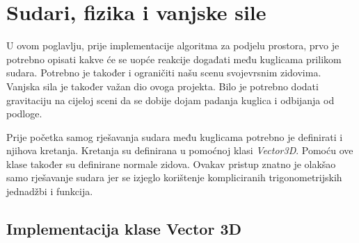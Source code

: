 \chapter{Sudari, fizika i vanjske sile}
U ovom poglavlju, prije implementacije algoritma za podjelu prostora, prvo je potrebno opisati kakve će se uopće reakcije događati među kuglicama prilikom sudara. Potrebno je također i ograničiti našu scenu svojevrsnim zidovima. Vanjska sila je također važan dio ovoga projekta. Bilo je potrebno dodati gravitaciju na cijeloj sceni da se dobije dojam padanja kuglica i odbijanja od podloge. 

Prije početka samog rješavanja sudara među kuglicama potrebno je definirati i njihova kretanja. Kretanja su definirana u pomoćnoj klasi \emph{Vector3D}. Pomoću ove klase također su definirane normale zidova. Ovakav pristup znatno je olakšao samo rješavanje sudara jer se izjeglo korištenje kompliciranih trigonometrijskih jednadžbi i funkcija.\newpage

\section{Implementacija klase Vector 3D}\label{sec:vec3}


